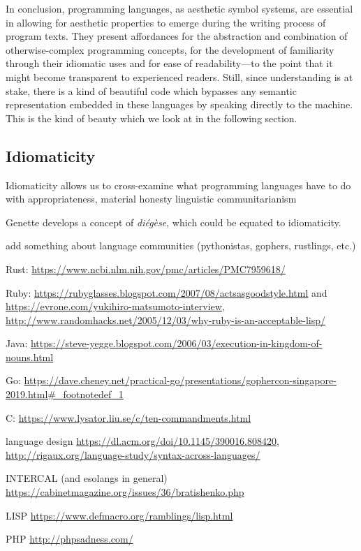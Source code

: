 In conclusion, programming languages, as aesthetic symbol systems, are essential in allowing for aesthetic properties to emerge during the writing process of program texts. They present affordances for the abstraction and combination of otherwise-complex programming concepts, for the development of familiarity through their idiomatic uses and for ease of readability—to the point that it might become transparent to experienced readers. Still, since understanding is at stake, there is a kind of beautiful code which bypasses any semantic representation embedded in these languages by speaking directly to the machine. This is the kind of beauty which we look at in the following section.

\subsection{Idiomaticity}
\label{subsec:idiomaticity}

Idiomaticity allows us to cross-examine what programming languages have to do with appropriateness, material honesty linguistic communitarianism

Genette develops a concept of \emph{diégèse}, which could be equated to idiomaticity.

add something about language communities (pythonistas, gophers, rustlings, etc.)

Rust: \url{https://www.ncbi.nlm.nih.gov/pmc/articles/PMC7959618/}

Ruby: \url{https://rubyglasses.blogspot.com/2007/08/actsasgoodstyle.html} and \url{https://evrone.com/yukihiro-matsumoto-interview}, \url{http://www.randomhacks.net/2005/12/03/why-ruby-is-an-acceptable-lisp/}

Java: \url{https://steve-yegge.blogspot.com/2006/03/execution-in-kingdom-of-nouns.html}

Go: \url{https://dave.cheney.net/practical-go/presentations/gophercon-singapore-2019.html#_footnotedef_1}

C: \url{https://www.lysator.liu.se/c/ten-commandments.html}

language design \url{https://dl.acm.org/doi/10.1145/390016.808420}, \url{http://rigaux.org/language-study/syntax-across-languages/}

INTERCAL (and esolangs in general) \url{https://cabinetmagazine.org/issues/36/bratishenko.php}

LISP \url{https://www.defmacro.org/ramblings/lisp.html}

PHP \url{http://phpsadness.com/}

